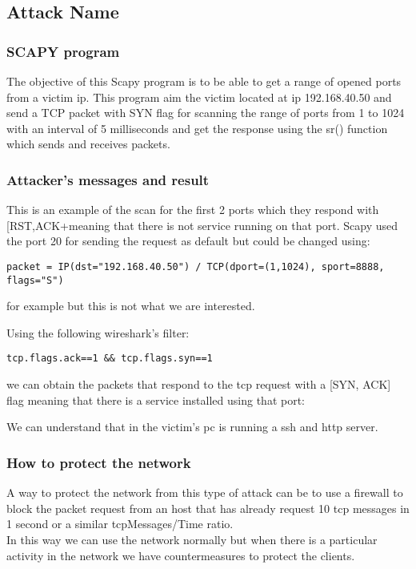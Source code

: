 \subsection{Attack Name}
\subsubsection{SCAPY program}

The objective of this Scapy program is to be able to get a range of opened ports from a victim ip. This program aim the victim located at ip 192.168.40.50 and send a TCP packet with SYN flag for scanning the range of ports from 1 to 1024 with an interval of 5 milliseconds and get the response using the sr() function which sends and receives packets.\par

\subsubsection{Attacker’s messages and result}


This is an example of the scan for the first 2 ports which they respond with [RST,ACK+meaning that there is not service running on that port.
Scapy used the port 20 for sending the request as default but could be changed using:\\
\begin{lstlisting}
packet = IP(dst="192.168.40.50") / TCP(dport=(1,1024), sport=8888, flags="S")
\end{lstlisting}
for example but this is not what we are interested.\par
Using the following wireshark’s filter: \\
\begin{lstlisting}
tcp.flags.ack==1 && tcp.flags.syn==1
\end{lstlisting}
we can obtain the packets that respond to the tcp request with a [SYN, ACK] flag meaning that there is a service installed using that port:\par
\medskip


We can understand that in the victim’s pc is running a ssh and http server.\par

\subsubsection{How to protect the network}
A way to protect the network from this type of attack can be to use a firewall to block the packet request from an host that has already request 10 tcp messages in 1 second or a similar tcpMessages/Time ratio.\\
In this way we can use the network normally but when there is a particular activity in the network we have countermeasures to protect the clients.\par
